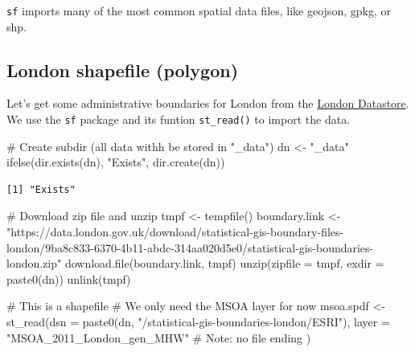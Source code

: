 \documentclass[
  letterpaper,
  DIV=11,
  numbers=noendperiod]{scrreprt}
\newenvironment{Shaded}{\begin{snugshade}}{\end{snugshade}}
\newcommand{\AttributeTok}[1]{\textcolor[rgb]{0.40,0.45,0.13}{#1}}
\newcommand{\CommentTok}[1]{\textcolor[rgb]{0.37,0.37,0.37}{#1}}
\newcommand{\FunctionTok}[1]{\textcolor[rgb]{0.28,0.35,0.67}{#1}}
\newcommand{\NormalTok}[1]{\textcolor[rgb]{0.00,0.23,0.31}{#1}}
\newcommand{\OtherTok}[1]{\textcolor[rgb]{0.00,0.23,0.31}{#1}}
\newcommand{\StringTok}[1]{\textcolor[rgb]{0.13,0.47,0.30}{#1}}
\begin{document}
\texttt{sf} imports many of the most common spatial data files, like
geojson, gpkg, or shp.

\hypertarget{london-shapefile-polygon}{%
\subsection{London shapefile (polygon)}\label{london-shapefile-polygon}}

Let's get some administrative boundaries for London from the
\href{https://data.london.gov.uk/dataset/statistical-gis-boundary-files-london}{London
Datastore}. We use the \texttt{sf} package and its funtion
\texttt{st\_read()} to import the data.

\begin{Shaded}
\begin{Highlighting}[]
\CommentTok{\# Create subdir (all data withh be stored in "\_data")}
\NormalTok{dn }\OtherTok{\textless{}{-}} \StringTok{"\_data"}
\FunctionTok{ifelse}\NormalTok{(}\FunctionTok{dir.exists}\NormalTok{(dn), }\StringTok{"Exists"}\NormalTok{, }\FunctionTok{dir.create}\NormalTok{(dn))}
\end{Highlighting}
\end{Shaded}

\begin{verbatim}
[1] "Exists"
\end{verbatim}

\begin{Shaded}
\begin{Highlighting}[]
\CommentTok{\# Download zip file and unzip}
\NormalTok{tmpf }\OtherTok{\textless{}{-}} \FunctionTok{tempfile}\NormalTok{()}
\NormalTok{boundary.link }\OtherTok{\textless{}{-}} \StringTok{"https://data.london.gov.uk/download/statistical{-}gis{-}boundary{-}files{-}london/9ba8c833{-}6370{-}4b11{-}abdc{-}314aa020d5e0/statistical{-}gis{-}boundaries{-}london.zip"}
\FunctionTok{download.file}\NormalTok{(boundary.link, tmpf)}
\FunctionTok{unzip}\NormalTok{(}\AttributeTok{zipfile =}\NormalTok{ tmpf, }\AttributeTok{exdir =} \FunctionTok{paste0}\NormalTok{(dn))}
\FunctionTok{unlink}\NormalTok{(tmpf)}

\CommentTok{\# This is a shapefile}
\CommentTok{\# We only need the MSOA layer for now}
\NormalTok{msoa.spdf }\OtherTok{\textless{}{-}} \FunctionTok{st\_read}\NormalTok{(}\AttributeTok{dsn =} \FunctionTok{paste0}\NormalTok{(dn, }\StringTok{"/statistical{-}gis{-}boundaries{-}london/ESRI"}\NormalTok{),}
                     \AttributeTok{layer =} \StringTok{"MSOA\_2011\_London\_gen\_MHW"} \CommentTok{\# Note: no file ending}
\NormalTok{                     )}
\end{Highlighting}
\end{Shaded}
\end{document}
